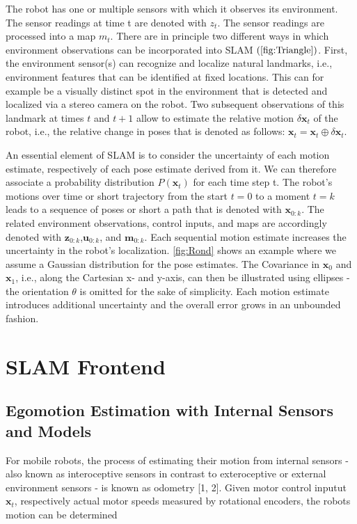 \documentclass{article}
\begin{document}
The robot has one or multiple sensors with which it observes its environment.  
The sensor readings at time t are denoted with ${z}_{t}$.  The sensor readings are processed into a map ${m}_{t}$.  
There are in principle two different ways in which environment observations can be incorporated into SLAM $\left(\cref{fig:Triangle}\right)$.  
First, the environment sensor(s) can recognize and localize natural landmarks, i.e., environment features that can be identified at fixed locations.  
This can for example be a visually distinct spot in the environment that is detected and localized via a stereo camera on the robot.  
Two subsequent observations of this landmark at times $t$ and $t + 1$ allow to estimate the relative motion $\delta\mathbf{x}_{t}$ of the robot, i.e., the relative change in poses that is denoted as follows: $\mathbf{x}_{t}=\mathbf{x}_{t}\oplus\delta\mathbf{x}_{t}$.

An essential element of SLAM is to consider the uncertainty of each motion estimate, respectively of each pose estimate derived from it.  
We can therefore associate a probability distribution $P(\mathbf{x}_t)$ for each time step t.  
The robot’s motions over time or short trajectory from the start $t= 0$ to a moment $t=k$ leads to a sequence of poses or short a path that is denoted with $\mathbf{x}_{0:k}$.  The related environment observations,  control inputs,  and maps are accordingly denoted with $\mathbf{z}_{0:k}$,$\mathbf{u}_{0:k}$, and $\mathbf{m}_{0:k}$.  
Each sequential motion estimate increases the uncertainty in the robot’s  localization. \cref{fig:Rond} shows  an  example  where  we  assume  a  Gaussian  distribution  for  the  pose  estimates.
The Covariance in $\mathbf{x}_{0}$ and $\mathbf{x}_{1}$, i.e., along the Cartesian x- and y-axis, can then be illustrated using ellipses - the orientation $\theta$ is omitted for the sake of simplicity.  
Each motion estimate introduces additional uncertainty and the overall error grows in an unbounded fashion.


\section{\label{sec:SLAM Fronted}SLAM Frontend}

\subsection{Egomotion Estimation with Internal Sensors and Models}
For mobile robots, the process of estimating their motion from internal sensors - also known as interoceptive sensors in contrast to exteroceptive or external environment sensors - is known as odometry [1, 2].  Given motor control inputut $\mathbf{x}_{t}$, respectively actual motor speeds measured by rotational encoders, the robots motion can be determined
\end{document}

